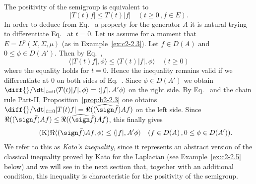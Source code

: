 The positivity of the semigroup is equivalent to
\begin{equation}\label{eq:c2-2.7}
|T(t)f| \leq T(t)|f| \quad (t \geq 0 \,, f \in E).
\end{equation}
In order to deduce from Eq.~ a property for the generator $A$ it is natural trying to differentiate Eq.~ at $t = 0$.
Let us assume for a moment that $E = L^p(X,\Sigma,\mu)$ (as in Example~\ref{ex:c2-2.3}).
Let $f \in D(A)$ and $0 \leq \phi \in D(A')$.
Then by Eq.~,
\begin{equation}\label{eq:c2-2.8}
	\langle |T(t)f|,\phi \rangle \leq \langle T(t)|f|,\phi \rangle \quad (t \geq 0)
\end{equation}
where the equality holds for $t = 0$.
Hence the inequality remains valid if we differentiate at $0$ on both sides of Eq.~.
Since $\phi \in D(A')$ we obtain $\diff{}/\dt|_{t=0} \langle T(t)|f|,\phi \rangle = \langle |f|,A'\phi \rangle$ on the right side.
By Eq.~ and the chain rule Part-II, Proposition~\ref{prop:b2-2.3} 
one obtains $\diff{}/\dt|_{t=0}|T(t)f| = \Re((\widehat{\sign} \bar{f})Af)$ on the left side.
Since $\Re((\sign \bar{f})Af) \leq \Re((\widehat{\sign} \bar{f})Af)$, this finally gives
\begin{equation*}\label{eq:c2-K} \tag{K}
\Re\langle(\sign \bar{f})Af,\phi \rangle \leq \langle |f|,A'\phi \rangle \quad (f \in D(A) \,, 0 \leq \phi \in D(A')).
\end{equation*}
We refer to this as \emph{Kato's inequality}, since it represents an abstract version of the classical inequality proved by Kato for the Laplacian (see Example~\ref{ex:c2-2.5} below) and we will see in the next section that, together with an additional condition, this inequality is characteristic for the positivity of the semigroup.

